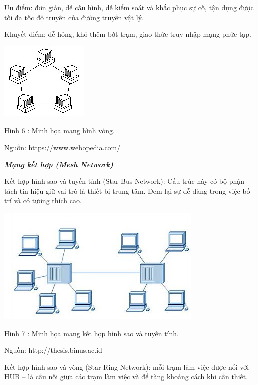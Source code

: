 \documentclass{report}
\begin{document}
\smallskip
\setlength{\parindent}{1cm}
Ưu điểm: đơn giản, dễ cấu hình, dễ kiểm soát và khắc phục sự cố, tận dụng được tối đa tốc độ truyền của đường truyền vật lý.

Khuyết điểm: dễ hỏng, khó thêm bớt trạm, giao thức truy nhập mạng phức tạp.



\begin{center}
     \includegraphics[scale=0.9]{ring}
\end{center}
\centerline{Hình 6 : Minh họa mạng hình vòng.}
\changefontsizes{12pt}
\centerline{Nguồn: https://www.webopedia.com/}

\changefontsizes{13pt}
\bigskip
\setlength{\parindent}{0.2cm}
\textbf{\textit{Mạng kết hợp (Mesh Network)}}

Kết hợp hình sao và tuyến tính (Star Bus Network): Cấu trúc này có bộ phận tách tín hiệu giữ vai trò là thiết bị trung tâm. Đem lại sự dễ dàng trong việc bố trí và có tương thích cao.

\begin{center}
     \includegraphics[scale=0.7]{starbus}
\end{center}
\centerline{Hình 7 : Minh họa mạng kết hợp hình sao và tuyến tính.}
\changefontsizes{12pt}
\centerline{Nguồn: http://thesis.binus.ac.id}


\bigskip
\changefontsizes{13pt}
\setlength{\parindent}{0.2cm}
Kết hợp hình sao và vòng (Star Ring Network): mỗi trạm làm việc được nối với HUB – là cầu nối giữa các trạm làm việc và để tǎng khoảng cách khi cần thiết.
\end{document}
